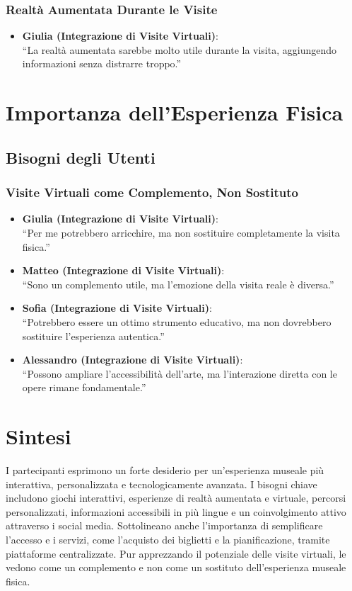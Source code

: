 \documentclass{article}
\begin{document}
\subsubsection{Realtà Aumentata Durante le Visite}

\begin{itemize}
    \item \textbf{Giulia (Integrazione di Visite Virtuali)}:\\
    ``La realtà aumentata sarebbe molto utile durante la visita, aggiungendo informazioni senza distrarre troppo.''
\end{itemize}

\section{Importanza dell'Esperienza Fisica}

\subsection{Bisogni degli Utenti}

\subsubsection{Visite Virtuali come Complemento, Non Sostituto}

\begin{itemize}
    \item \textbf{Giulia (Integrazione di Visite Virtuali)}:\\
    ``Per me potrebbero arricchire, ma non sostituire completamente la visita fisica.''
    \item \textbf{Matteo (Integrazione di Visite Virtuali)}:\\
    ``Sono un complemento utile, ma l'emozione della visita reale è diversa.''
    \item \textbf{Sofia (Integrazione di Visite Virtuali)}:\\
    ``Potrebbero essere un ottimo strumento educativo, ma non dovrebbero sostituire l'esperienza autentica.''
    \item \textbf{Alessandro (Integrazione di Visite Virtuali)}:\\
    ``Possono ampliare l'accessibilità dell'arte, ma l'interazione diretta con le opere rimane fondamentale.''
\end{itemize}

\section*{Sintesi}

I partecipanti esprimono un forte desiderio per un'esperienza museale più interattiva, personalizzata e tecnologicamente avanzata. I bisogni chiave includono giochi interattivi, esperienze di realtà aumentata e virtuale, percorsi personalizzati, informazioni accessibili in più lingue e un coinvolgimento attivo attraverso i social media. Sottolineano anche l'importanza di semplificare l'accesso e i servizi, come l'acquisto dei biglietti e la pianificazione, tramite piattaforme centralizzate. Pur apprezzando il potenziale delle visite virtuali, le vedono come un complemento e non come un sostituto dell'esperienza museale fisica.
\end{document}
